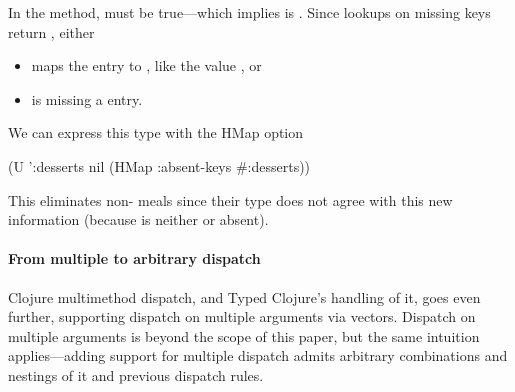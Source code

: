 In the  method,
must be true---which implies
%
%
is .
%
Since lookups on missing keys return , either
\begin{itemize}
  \item {} maps the  entry to , like the value , or
  \item {} is missing a  entry.%
\end{itemize}
We can express this type with the  HMap option
\begin{cljlisting}
(U '{:desserts nil} (HMap :absent-keys #{:desserts}))
\end{cljlisting}
This eliminates non- meals
since their  type does not agree
with this new information (because 
is neither  or absent).


\paragraph{From multiple to arbitrary dispatch}
Clojure multimethod dispatch, and Typed Clojure's handling of it, goes
even further, supporting dispatch on multiple arguments via vectors.
%
Dispatch on multiple arguments is beyond the scope of this paper,
but the same intuition applies---adding support for multiple dispatch
admits arbitrary combinations and nestings
of it and previous dispatch rules.

%
%

